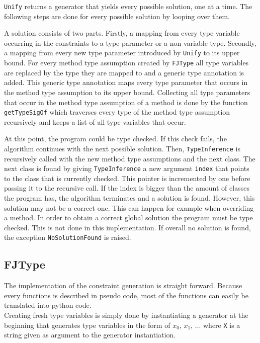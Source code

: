 \verb|Unify| returns a generator that yields every possible solution, one at a time. The following steps are done for every possible solution by looping over them.

A solution consists of two parts. Firstly, a mapping from every type variable occurring in the constraints to a type parameter or a non variable type. Secondly, a mapping from every new type parameter introduced by \verb|Unify| to its upper bound.
For every method type assumption created by \verb|FJType| all type variables are replaced by the type they are mapped to and
a generic type annotation is added. This generic type annotation maps every type parameter that occurs in the method type assumption to its upper bound.
Collecting all type parameters that occur in the method type assumption of a method is done by the function \verb|getTypeSigOf| which traverses every type of the method type assumption recursively and keeps a list of all type variables that occur.

At this point, the program could be type checked. If this check fails, the algorithm continues with the next possible solution.
Then, \verb|TypeInference| is recursively called with the new method type assumptions and the next class.
The next class is found by giving \verb|TypeInference| a new argument \verb|index| that points to the class that is currently checked. This pointer is incremented by one before passing it to the recursive call.
If the index is bigger than the amount of classes the program has, the algorithm terminates and a solution is found.
However, this solution may not be a correct one. This can happen for example when overriding a method. In order to obtain a correct global solution
the program must be type checked. This is not done in this implementation.
If overall no solution is found, the exception \verb|NoSolutionFound| is raised.

\subsection{FJType}
The implementation of the constraint generation is straight forward. Because every functions is described in pseudo code, most of the functions can easily be translated into python code. \\
Creating fresh type variables is simply done by instantiating a generator at the beginning that generates type variables in the form of $x_0$, $x_1$, ... where \verb|X| is a string given as argument to the generator instantiation. \\

